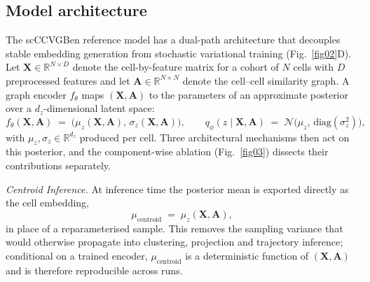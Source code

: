 \documentclass[referee, pdflatex, sn-vancouver-num]{sn-jnl}
\begin{document}
\subsection{Model architecture}\label{sec:architecture}

The scCCVGBen reference model has a dual-path architecture that decouples stable embedding generation from stochastic variational training (Fig.~\ref{fig02}D). Let $\mathbf{X}\in\mathbb{R}^{N\times D}$ denote the cell-by-feature matrix for a cohort of $N$ cells with $D$ preprocessed features and let $\mathbf{A}\in\mathbb{R}^{N\times N}$ denote the cell--cell similarity graph. A graph encoder $f_\theta$ maps $(\mathbf{X},\mathbf{A})$ to the parameters of an approximate posterior over a $d_z$-dimensional latent space:
\begin{equation}
f_\theta(\mathbf{X},\mathbf{A}) \;=\; \bigl(\mu_z(\mathbf{X},\mathbf{A}),\,\sigma_z(\mathbf{X},\mathbf{A})\bigr),\qquad q_\phi(z\mid \mathbf{X},\mathbf{A}) \;=\; \mathcal{N}\!\bigl(\mu_z,\,\mathrm{diag}(\sigma_z^2)\bigr),
\label{eq:posterior}
\end{equation}
with $\mu_z, \sigma_z \in \mathbb{R}^{d_z}$ produced per cell. Three architectural mechanisms then act on this posterior, and the component-wise ablation (Fig.~\ref{fig03}) dissects their contributions separately.

\textit{Centroid Inference.} At inference time the posterior mean is exported directly as the cell embedding,
\begin{equation}
\mu_{\text{centroid}} \;=\; \mu_z(\mathbf{X},\mathbf{A}),
\label{eq:centroid}
\end{equation}
in place of a reparameterised sample. This removes the sampling variance that would otherwise propagate into clustering, projection and trajectory inference; conditional on a trained encoder, $\mu_{\text{centroid}}$ is a deterministic function of $(\mathbf{X},\mathbf{A})$ and is therefore reproducible across runs.
\end{document}
